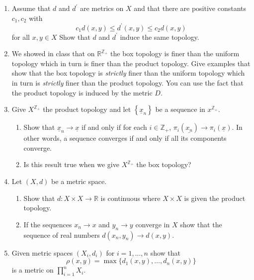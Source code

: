\documentclass[11pt]{article}
\newcommand{\cbr}[1]{\left\{#1\right\}}
\begin{document}
\begin{enumerate}
\begin{proof}
      Hence $h$ is a homeomorphism as desired, so that $\prod_{\lambda\in\Lambda}X_\lambda$ and $\prod_{\lambda\in\Lambda}Y_{\lambda}$ are homeomorphic.
    \end{proof}
    \item Assume that $d$ and $d^{\prime}$ are metrics on $X$ and that there are positive constants $c_1,c_2$ with \[c_1d(x,y)\leq d^{\prime}(x,y)\leq c_2d(x,y)\] for all $x,y\in X$ Show that $d$ and $d^{\prime}$ induce the same topology.
    \item We showed in class that on $\mathbb{R}^{\mathbb{Z}_+}$ the box topology is finer than the uniform topology which in turn is finer than the product topology. Give examples that show that the box topology is \textit{strictly} finer than the uniform topology which in turn is \textit{strictly} finer than the product topology. You can use the fact that the product topology is induced by the metric $D$.
    \item Give $X^{\mathbb{Z}_+}$ the product topology and let $\cbr{\underline{x}_n}$ be a sequence in $x^{\mathbb{Z}_+}$.\begin{enumerate}[label=(\alph*)]
      \item Show that $\underline{x}_n\to \underline{x}$ if and only if for each $i\in\mathbb{Z}_+$, $\pi_i(\underline{x_n})\to\pi_i(\underline{x})$. In other words, a sequence converges if and only if all its components converge.
      \item Is this result true when we give $X^{\mathbb{Z}_+}$ the box topology?
    \end{enumerate}
    \item Let $(X,d)$ be a metric space. \begin{enumerate}[label=(\alph*)]
      \item Show that $d\colon X\times X\to \mathbb{R}$ is continuous where $X\times X$ is given the product topology.
      \item If the sequences $x_n\to x$ and $y_n\to y$ converge in $X$ show that the sequence of real numbers $d(x_n,y_n)\to d(x,y)$.
    \end{enumerate}
    \item Given metric spaces $(X_i, d_i)$ for $i = 1,\dots,n$ show that \[\rho(x,y) = \max\{d_1(x,y),\dots,d_n(x,y)\}\] is a metric on $\prod_{i=1}^n X_i$.
\end{enumerate}
\end{document}
